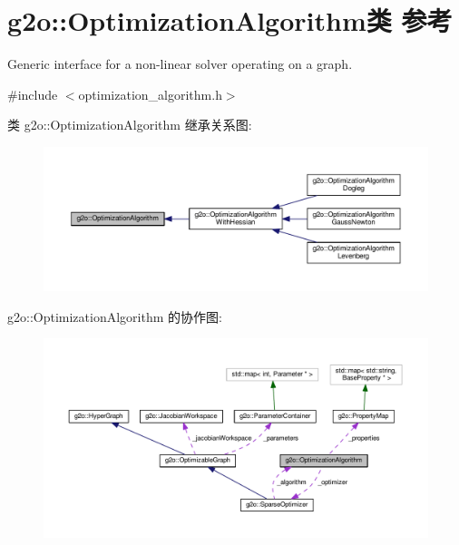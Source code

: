 \hypertarget{classg2o_1_1OptimizationAlgorithm}{\section{g2o\-:\-:Optimization\-Algorithm类 参考}
\label{classg2o_1_1OptimizationAlgorithm}
}


Generic interface for a non-\/linear solver operating on a graph.  




{\ttfamily \#include $<$optimization\-\_\-algorithm.\-h$>$}



类 g2o\-:\-:Optimization\-Algorithm 继承关系图\-:
\nopagebreak
\begin{figure}[H]
\begin{center}
\leavevmode
\includegraphics[width=350pt]{classg2o_1_1OptimizationAlgorithm__inherit__graph}
\end{center}
\end{figure}


g2o\-:\-:Optimization\-Algorithm 的协作图\-:
\nopagebreak
\begin{figure}[H]
\begin{center}
\leavevmode
\includegraphics[width=350pt]{classg2o_1_1OptimizationAlgorithm__coll__graph}
\end{center}
\end{figure}
